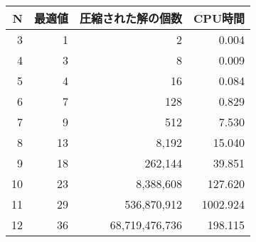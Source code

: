 \begin{tabular}{r|r|r|r}
 N& 最適値 & 圧縮された解の個数& CPU時間 \\
 \hline
 3&	1&	2&	0.004 \\
 4&	3&	8&	0.009 \\
 5&	4&	16&	0.084 \\
 6&	7&	128&	0.829 \\
 7&	9&	512&	7.530 \\
 8&	13&	8,192&	15.040 \\
 9&	18&	262,144&	39.851 \\
 10&	23&	8,388,608&	127.620 \\
 11&	29&	536,870,912&	1002.924 \\
 12&	36&	68,719,476,736&	198.115 \\\hline
\end{tabular}
